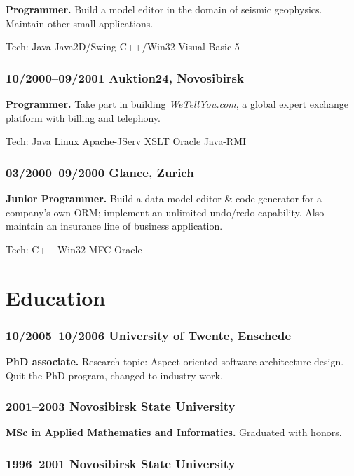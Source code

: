 \documentclass[a4paper, twocolumn, 10pt]{article}
\begin{document}
\textbf{Programmer.} Build a model editor in the domain of seismic geophysics. Maintain other small
applications.

Tech: Java Java2D/Swing C++/Win32 Visual-Basic-5

\subsubsection*{10/2000--09/2001 Auktion24, Novosibirsk}

\textbf{Programmer.} Take part in building \emph{WeTellYou.com}, a global expert exchange platform
with billing and telephony.

Tech: Java Linux Apache-JServ XSLT Oracle Java-RMI

\subsubsection*{03/2000--09/2000 Glance, Zurich}

\textbf{Junior Programmer.} Build a data model editor \& code generator for a company's own ORM;
implement an unlimited undo/redo capability. Also maintain an insurance line of business
application.

Tech: C++ Win32 MFC Oracle

\section*{Education}

\subsubsection*{10/2005--10/2006 University of Twente, Enschede}

\textbf{PhD associate.} Research topic: Aspect-oriented software architecture design. Quit the PhD
program, changed to industry work.

\subsubsection*{2001--2003 Novosibirsk State University}

\textbf{MSc in Applied Mathematics and Informatics.} Graduated with honors.

\subsubsection*{1996--2001 Novosibirsk State University}
\end{document}
